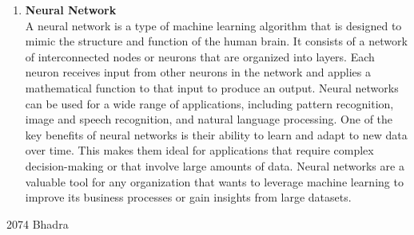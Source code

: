 \documentclass[12pt]{article}
\begin{document}
\begin{enumerate}
\begin{enumerate}
        \item {\bfseries Neural Network\\}
        A neural network is a type of machine learning algorithm that is designed to mimic the structure and function of the human brain. It consists of a network of interconnected nodes or neurons that are organized into layers. Each neuron receives input from other neurons in the network and applies a mathematical function to that input to produce an output. Neural networks can be used for a wide range of applications, including pattern recognition, image and speech recognition, and natural language processing. One of the key benefits of neural networks is their ability to learn and adapt to new data over time. This makes them ideal for applications that require complex decision-making or that involve large amounts of data. Neural networks are a valuable tool for any organization that wants to leverage machine learning to improve its business processes or gain insights from large datasets.
    \end{enumerate}
\end{enumerate}
\pagebreak
{\Large 2074 Bhadra}
\end{document}
